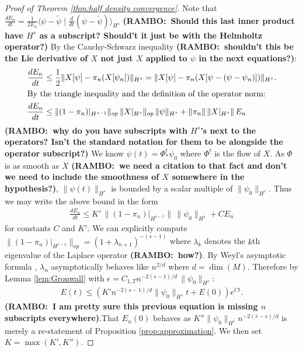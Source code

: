 \documentclass[final,leqno]{siamltex1213}
\newcommand{\ram}[1]{{\normalsize{\textbf{({\color{red}RAMBO:\ }#1)}}}}
\begin{document}
\begin{proof}[Proof of Theorem \ref{thm:half density convergence}]
	Note that $\frac{dE_{n}}{dt} = \frac{1}{2E_{n}} \langle  \psi - \tilde{\psi} \mid \frac{d}{dt} ( \psi -\tilde{\psi} )\rangle_{H^{s}}$ \ram{Should this last inner product have $H^{s}$ as a subscript? Should't it just be with the Helmholtz operator?}
	By the Cauchy-Schwarz inequality \ram{shouldn't this be the Lie derivative of $X$ not just $X$ applied to $\psi$ in the next equations?}:
	\begin{align}
		\frac{dE_{n}}{dt} &\leq  \frac{1}{2} \| X[\psi] - \pi_{n}(X[\psi_{n}]) \|_{H^{s}} = \| X[\psi] - \pi_{n}( X[\psi- (\psi-\psi_{n})]) \|_{H^{s}}. \\
	\intertext{By the triangle inequality and the definition of the operator norm:}
		\frac{dE_{n}}{dt}&\leq \| (1-\pi_{n})|_{H^{s-1}} \|_{op} \, \|X|_{H^{s}} \|_{op} \, \| \psi \|_{H^{s}} + \| \pi_{n} \| \, \|X|_{H^{s}} \| \, E_{n}
	\end{align}
	\ram{why do you have subscripts with $H^{s}$'s next to the operators? Isn't the standard notation for them to be alongside the operator subscript?}
	We know $\psi(t) = \Phi^{t}_{*}\psi_{0}$ where $\Phi^{t}$ is the flow of $X$.
	As $\Phi$ is as smooth as $X$ \ram{we need a citation to that fact and don't we need to include the smoothness of $X$ somewhere in the hypothesis?}, $\| \psi(t) \|_{H^{s}}$ is bounded by a scalar multiple of $\| \psi_{0} \|_{H^{s}}$.
	Thus we may write the above bound in the form
	\begin{align}
		\frac{dE_{n}}{dt} \leq K' \, \| (1- \pi_{n})|_{H^{s-1}} \| \, \| \psi_{0}\|_{H^{s}}+ C E_{n}
	\end{align}
	for constants $C$ and $K'$.
	We can explicitly compute $\| (1-\pi_{n})|_{H^{s-1}} \|_{op} = (1+\lambda_{n+1})^{-(s-1)}$ where $\lambda_{k}$ denotes the $k$th eigenvalue of the Laplace operator \ram{how?}.
	By Weyl's asymptotic formula \cite[Theorem B.2]{Chavel1984}, $\lambda_{n}$ asymptotically behaves like $n^{2/d}$ where $d = \dim(M)$.
	Therefore by Lemma \ref{lem:Gronwall} with $\epsilon = C_{1,T} n^{-2(s-1) / d} \, \| \psi_{0}\|_{H^{s}}$:
	\begin{align}
		E(t) \leq ( K' n^{-2(s-1) / d} \| \psi_{0} \|_{H^{s}} t+  E(0) ) e^{C t}.
	\end{align}
	\ram{I am pretty sure this previous equation is missing $n$ subscripts everywhere}.That $E_{n}(0)$ behaves as $K'' \| \psi_{0} \|_{H^{\bar{s}}} n^{-2(\bar{s}-s)/d}$ is merely a re-statement of Proposition \ref{prop:approximation}.
	We then set $K = \max(K', K'')$.
\end{proof}
\end{document}
